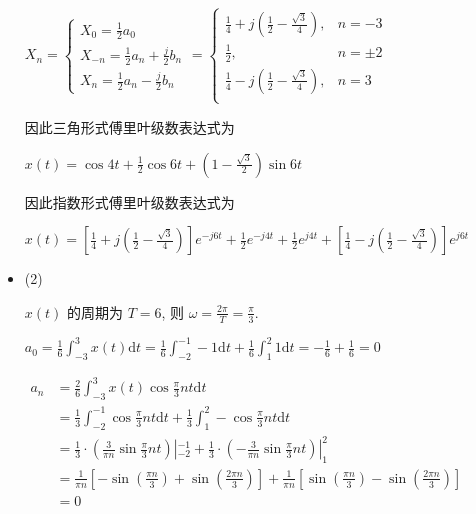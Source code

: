 \documentclass[a4paper,UTF8]{article}
\numberwithin{equation}{section}
\begin{document}
\begin{framed}
\begin{spacing}{1.5}
\begin{itemize}
      $X_n = \begin{cases}X_0 = \frac{1}{2}a_0 \\ X_{-n} = \frac{1}{2}a_n + \frac{j}{2} b_n \\ X_n = \frac{1}{2}a_n - \frac{j}{2} b_n\end{cases} = \begin{cases}
          \frac{1}{4}+j(\frac{1}{2}-\frac{\sqrt{3}}{4}), & n = - 3 \\
          \frac{1}{2}, & n = \pm 2 \\
          \frac{1}{4}-j(\frac{1}{2}-\frac{\sqrt{3}}{4}), & n = 3 \\
      \end{cases}$
      
      因此三角形式傅里叶级数表达式为
      
      $\displaystyle x(t) = \cos 4t + \frac{1}{2}\cos 6t + (1 - \frac{\sqrt{3}}{2})\sin 6t$
      
      因此指数形式傅里叶级数表达式为
      
      $\displaystyle x(t) = [\frac{1}{4}+j(\frac{1}{2}-\frac{\sqrt{3}}{4})]e^{-j 6t} + \frac{1}{2}e^{-j 4t} + \frac{1}{2}e^{j 4t} + [\frac{1}{4}-j(\frac{1}{2}-\frac{\sqrt{3}}{4})]e^{j 6t}$
      
      
      \item (2)
      
      $x(t)$ 的周期为 $T = 6$, 则 $\displaystyle \omega = \frac{2\pi}{T} = \frac{\pi}{3}$.
      
      $\displaystyle a_0 = \frac{1}{6}\int_{-3}^{3}x(t)\mathrm{d}t = \frac{1}{6}\int_{-2}^{-1}-1\mathrm{d}t + \frac{1}{6}\int_{1}^{2}1\mathrm{d}t = - \frac{1}{6} + \frac{1}{6} = 0$
      
      $
      \begin{aligned}
      a_n & = \frac{2}{6}\int_{-3}^{3}x(t)\cos \frac{\pi}{3}nt \mathrm{d}t  \\
      & = \frac{1}{3}\int_{-2}^{-1}\cos \frac{\pi}{3}nt \mathrm{d}t + \frac{1}{3}\int_{1}^{2}-\cos \frac{\pi}{3}nt \mathrm{d}t  \\
      & = \frac{1}{3}\cdot (\frac{3}{\pi n}\sin \frac{\pi}{3}nt)|_{-2}^{-1} + \frac{1}{3}\cdot (-\frac{3}{\pi n}\sin \frac{\pi}{3}nt)|_{1}^{2}  \\
      & = \frac{1}{\pi n}[- \sin{(\frac{\pi n}{3})} + \sin{(\frac{2 \pi n}{3})}] + \frac{1}{\pi n}[\sin{(\frac{\pi n}{3})} - \sin{(\frac{2 \pi n}{3})}]  \\
      & = 0  \\
      \end{aligned}
      $
      

\end{itemize}
\end{spacing}
\end{framed}
\end{document}
